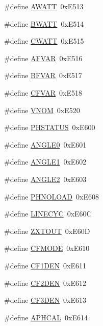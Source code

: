 \begin{DoxyCompactItemize}
\item 
\#define \hyperlink{a00036_a70d4c8c1577490f1b69cfab591458142}{A\-W\-A\-T\-T}~0x\-E513
\item 
\#define \hyperlink{a00036_a3a60995ae993fd06892df7023a9f496c}{B\-W\-A\-T\-T}~0x\-E514
\item 
\#define \hyperlink{a00036_aeb58aae2f3e0c16a12cf4b6b03d6c5d9}{C\-W\-A\-T\-T}~0x\-E515
\item 
\#define \hyperlink{a00036_af0dabbc7f7119acf7bc4b359430b9087}{A\-F\-V\-A\-R}~0x\-E516
\item 
\#define \hyperlink{a00036_a2172be4f07d67f1ffea0218f5425b1ad}{B\-F\-V\-A\-R}~0x\-E517
\item 
\#define \hyperlink{a00036_a8edc01effbd3c82649af3c8ad858f1e8}{C\-F\-V\-A\-R}~0x\-E518
\item 
\#define \hyperlink{a00036_a7f5107f4dbb40b5aa9f3e6de81d5b1e9}{V\-N\-O\-M}~0x\-E520
\item 
\#define \hyperlink{a00036_a3f530aec5cb9754e76ffadfa165ca107}{P\-H\-S\-T\-A\-T\-U\-S}~0x\-E600
\item 
\#define \hyperlink{a00036_a641f685f54defa54499b05d06ac2c3ef}{A\-N\-G\-L\-E0}~0x\-E601
\item 
\#define \hyperlink{a00036_a9b16c8daa98acc491d5f11fe4dd0a3f0}{A\-N\-G\-L\-E1}~0x\-E602
\item 
\#define \hyperlink{a00036_a7b4d4bc753e350f0a9111d8ae37cf6cc}{A\-N\-G\-L\-E2}~0x\-E603
\item 
\#define \hyperlink{a00036_a603a075882edcbaa63c480c44f436947}{P\-H\-N\-O\-L\-O\-A\-D}~0x\-E608
\item 
\#define \hyperlink{a00036_a9d2caa865052cffb4b8850e55ee18c8d}{L\-I\-N\-E\-C\-Y\-C}~0x\-E60\-C
\item 
\#define \hyperlink{a00036_a29659e274070aaec5da2ad7752f60a51}{Z\-X\-T\-O\-U\-T}~0x\-E60\-D
\item 
\#define \hyperlink{a00036_ad45c59a4f01f3e4f96f2c481077b6912}{C\-F\-M\-O\-D\-E}~0x\-E610
\item 
\#define \hyperlink{a00036_ab5d23f853f029333e3b4e734325c810b}{C\-F1\-D\-E\-N}~0x\-E611
\item 
\#define \hyperlink{a00036_ae1659576b77ff128469caf7fa1cc62ff}{C\-F2\-D\-E\-N}~0x\-E612
\item 
\#define \hyperlink{a00036_a6a852ae480e66cc3de3504e2e5dda070}{C\-F3\-D\-E\-N}~0x\-E613
\item 
\#define \hyperlink{a00036_af7bcab75b737ab6d6d02cea33593a062}{A\-P\-H\-C\-A\-L}~0x\-E614
\item 

\end{DoxyCompactItemize}
